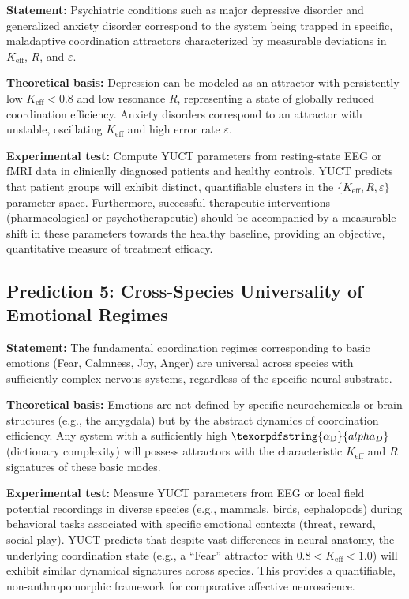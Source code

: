 \documentclass[12pt,a4paper]{article}
\DeclareRobustCommand{\alD}{\texorpdfstring{\ensuremath{\alpha_{\mathrm{D}}}}{alpha_D}}
\begin{document}
	\textbf{Statement:} Psychiatric conditions such as major depressive disorder and generalized anxiety disorder correspond to the system being trapped in specific, maladaptive coordination attractors characterized by measurable deviations in \(K_{\mathrm{eff}}\), \(R\), and \(\varepsilon\).
	
	\textbf{Theoretical basis:} Depression can be modeled as an attractor with persistently low \(K_{\mathrm{eff}} < 0.8\) and low resonance \(R\), representing a state of globally reduced coordination efficiency. Anxiety disorders correspond to an attractor with unstable, oscillating \(K_{\mathrm{eff}}\) and high error rate \(\varepsilon\).
	
	\textbf{Experimental test:} Compute YUCT parameters from resting-state EEG or fMRI data in clinically diagnosed patients and healthy controls. YUCT predicts that patient groups will exhibit distinct, quantifiable clusters in the \(\{K_{\mathrm{eff}}, R, \varepsilon\}\) parameter space. Furthermore, successful therapeutic interventions (pharmacological or psychotherapeutic) should be accompanied by a measurable shift in these parameters towards the healthy baseline, providing an objective, quantitative measure of treatment efficacy.
	
	\subsection{Prediction 5: Cross-Species Universality of Emotional Regimes}
	
	\textbf{Statement:} The fundamental coordination regimes corresponding to basic emotions (Fear, Calmness, Joy, Anger) are universal across species with sufficiently complex nervous systems, regardless of the specific neural substrate.
	
	\textbf{Theoretical basis:} Emotions are not defined by specific neurochemicals or brain structures (e.g., the amygdala) but by the abstract dynamics of coordination efficiency. Any system with a sufficiently high \(\alD\) (dictionary complexity) will possess attractors with the characteristic \(K_{\mathrm{eff}}\) and \(R\) signatures of these basic modes.
	
	\textbf{Experimental test:} Measure YUCT parameters from EEG or local field potential recordings in diverse species (e.g., mammals, birds, cephalopods) during behavioral tasks associated with specific emotional contexts (threat, reward, social play). YUCT predicts that despite vast differences in neural anatomy, the underlying coordination state (e.g., a ``Fear'' attractor with \(0.8 < K_{\mathrm{eff}} < 1.0\)) will exhibit similar dynamical signatures across species. This provides a quantifiable, non-anthropomorphic framework for comparative affective neuroscience.
	
\end{document}
